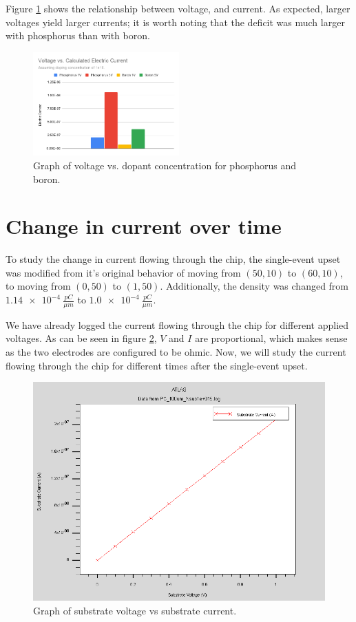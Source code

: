 \documentclass[12pt]{article}
\begin{document}
Figure \ref{fig:voltvcurrent} shows the relationship between voltage, and current. As expected, larger voltages yield larger currents; it is worth noting that the deficit was much larger with phosphorus than with boron.

\begin{figure}[H]
  \centering
  \includegraphics[width=0.5\textwidth]{voltvcurrent}
  \caption{Graph of voltage vs. dopant concentration for phosphorus and boron.}
  \label{fig:voltvcurrent}
\end{figure}

\section{Change in current over time}
To study the change in current flowing through the chip, the single-event upset was modified from it's original behavior of moving from $(50, 10)$ to $(60, 10)$, to moving from $(0, 50)$ to $(1, 50)$. Additionally, the density was changed from $\SI{1.14e-4}{\frac{pC}{{\mu}m}}$ to $\SI{1.0e-4}{\frac{pC}{{\mu}m}}$.

We have already logged the current flowing through the chip for different applied voltages. As can be seen in figure \ref{fig:voltvcurrentlog}, $V$ and $I$ are proportional, which makes sense as the two electrodes are configured to be ohmic. Now, we will study the current flowing through the chip for different times after the single-event upset.

\begin{figure}[H]
  \centering
  \includegraphics[width=\textwidth]{voltvcurrentlog}
  \caption{Graph of substrate voltage vs substrate current.}
  \label{fig:voltvcurrentlog}
\end{figure}
\end{document}

